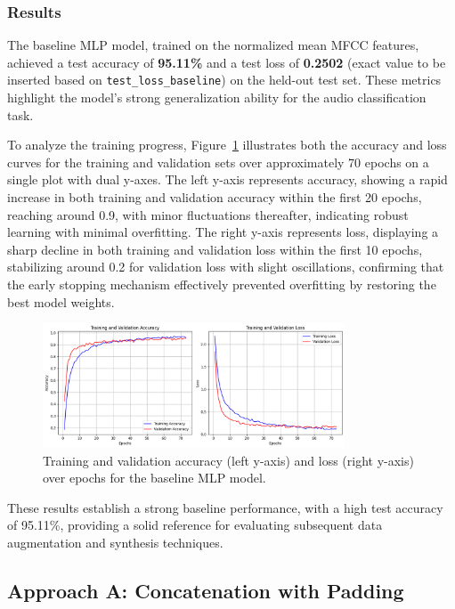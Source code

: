 \documentclass[12pt]{article}
\begin{document}
\subsubsection{Results}

The baseline MLP model, trained on the normalized mean MFCC features, achieved a test accuracy of \textbf{95.11\%} and a test loss of \textbf{0.2502} (exact value to be inserted based on \texttt{test\_loss\_baseline}) on the held-out test set. These metrics highlight the model's strong generalization ability for the audio classification task.

To analyze the training progress, Figure~\ref{fig:train_progress} illustrates both the accuracy and loss curves for the training and validation sets over approximately 70 epochs on a single plot with dual y-axes. The left y-axis represents accuracy, showing a rapid increase in both training and validation accuracy within the first 20 epochs, reaching around 0.9, with minor fluctuations thereafter, indicating robust learning with minimal overfitting. The right y-axis represents loss, displaying a sharp decline in both training and validation loss within the first 10 epochs, stabilizing around 0.2 for validation loss with slight oscillations, confirming that the early stopping mechanism effectively prevented overfitting by restoring the best model weights.

\begin{figure}[h]
    \centering
    \includegraphics[width=0.8\textwidth]{train_baseline.png}
    \caption{Training and validation accuracy (left y-axis) and loss (right y-axis) over epochs for the baseline MLP model.}
    \label{fig:train_progress}
\end{figure}

These results establish a strong baseline performance, with a high test accuracy of 95.11\%, providing a solid reference for evaluating subsequent data augmentation and synthesis techniques.

\subsection{Approach A: Concatenation with Padding}
\end{document}

